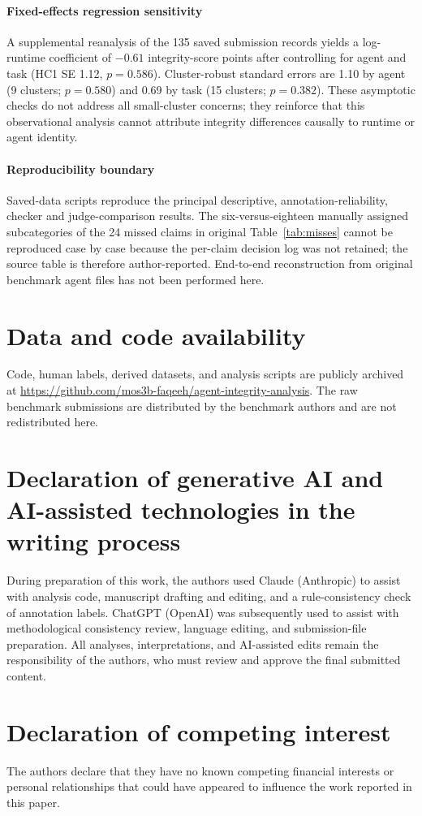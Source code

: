 \documentclass[preprint,12pt,authoryear]{elsarticle}
\newif\ifanon \anonfalse
\begin{document}
\paragraph{Fixed-effects regression sensitivity} A supplemental reanalysis of the 135 saved submission records yields a log-runtime coefficient of $-0.61$ integrity-score points after controlling for agent and task (HC1 SE 1.12, $p=0.586$). Cluster-robust standard errors are 1.10 by agent (9 clusters; $p=0.580$) and 0.69 by task (15 clusters; $p=0.382$). These asymptotic checks do not address all small-cluster concerns; they reinforce that this observational analysis cannot attribute integrity differences causally to runtime or agent identity.

\paragraph{Reproducibility boundary} Saved-data scripts reproduce the principal descriptive, annotation-reliability, checker and judge-comparison results. The six-versus-eighteen manually assigned subcategories of the 24 missed claims in original Table~\ref{tab:misses} cannot be reproduced case by case because the per-claim decision log was not retained; the source table is therefore author-reported. End-to-end reconstruction from original benchmark agent files has not been performed here.

\clearpage
\section*{Data and code availability}
\ifanon
Code, human labels, derived datasets, and analysis scripts are publicly archived. The repository URL and the external benchmark source have been supplied separately to the handling editor for double-anonymized review; the non-identifying access information will be provided to reviewers if permitted by the journal. The raw benchmark submissions are distributed by the benchmark authors and are not redistributed here.
\else
Code, human labels, derived datasets, and analysis scripts are publicly archived at \url{https://github.com/mos3b-faqeeh/agent-integrity-analysis}. The raw benchmark submissions are distributed by the benchmark authors and are not redistributed here.
\fi

\section*{Declaration of generative AI and AI-assisted technologies in the writing process}
During preparation of this work, the authors used Claude (Anthropic) to assist with analysis code, manuscript drafting and editing, and a rule-consistency check of annotation labels. ChatGPT (OpenAI) was subsequently used to assist with methodological consistency review, language editing, and submission-file preparation. All analyses, interpretations, and AI-assisted edits remain the responsibility of the authors, who must review and approve the final submitted content.

\section*{Declaration of competing interest}
The authors declare that they have no known competing financial interests or personal relationships that could have appeared to influence the work reported in this paper.



\end{document}
